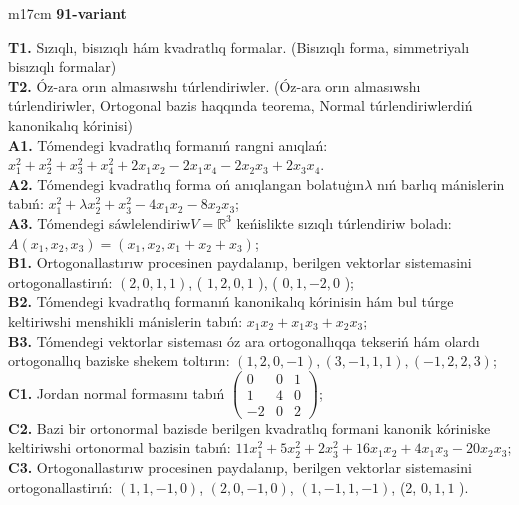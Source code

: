 \documentclass{article}
\begin{document}
\begin{tabular}{m{17cm}}
\textbf{91-variant}
\newline

\textbf{T1.} Sızıqlı, bisızıqlı hám kvadratlıq formalar. (Bisızıqlı forma,  simmetriyalı bisızıqlı formalar)  \\
\textbf{T2.} Óz-ara orın almasıwshı túrlendiriwler. (Óz-ara orın almasıwshı túrlendiriwler,  Ortogonal bazis haqqında teorema,  Normal túrlendiriwlerdiń kanonikalıq kórinisi) \\
\textbf{A1.} Tómendegi kvadratlıq formanıń rangni anıqlań: \(x_{1}^{2} + x_{2}^{2} + x_{3}^{2} + x_{4}^{2} + 2x_{1}x_{2} - 2x_{1}x_{4} - 2x_{2}x_{3} + 2x_{3}x_{4}\). \\
\textbf{A2.} Tómendegi kvadratlıq forma oń anıqlangan bolatuģın\(\lambda\) nıń barlıq mánislerin tabıń: \(x_{1}^{2} + \lambda x_{2}^{2} + x_{3}^{2} - 4x_{1}x_{2} - 8x_{2}x_{3}\); \\
\textbf{A3.} Tómendegi sáwlelendiriw\(V = \mathbb{R}^{3}\) keńislikte sızıqlı túrlendiriw boladı: \(A\left( x_{1},x_{2},x_{3} \right) = \left( x_{1},x_{2},x_{1} + x_{2} + x_{3} \right)\); \\
\textbf{B1.} Ortogonallastırıw procesinen paydalanıp, berilgen vektorlar sistemasini ortogonallastirıń: \((2,0,1,1)\), ( \(1,2,0,1\) ), ( \(0,1, - 2,0\) ); \\
\textbf{B2.} Tómendegi kvadratlıq formanıń kanonikalıq kórinisin hám bul túrge keltiriwshi menshikli mánislerin tabıń: \(x_{1}x_{2} + x_{1}x_{3} + x_{2}x_{3}\); \\
\textbf{B3.} Tómendegi vektorlar sisteması óz ara ortogonallıqqa tekseriń hám olardı ortogonallıq baziske shekem toltırın: \((1,2,0, - 1),(3, - 1,1,1),( - 1,2,2,3)\); \\
\textbf{C1.} Jordan normal formasını tabıń \(\begin{pmatrix} 0 & 0 & 1 \\ 1 & 4 & 0 \\  - 2 & 0 & 2 \end{pmatrix}\); \\
\textbf{C2.} Bazi bir ortonormal bazisde berilgen kvadratlıq formani kanonik kóriniske keltiriwshi ortonormal bazisin tabıń: \(11x_{1}^{2} + 5x_{2}^{2} + 2x_{3}^{2} + 16x_{1}x_{2} + 4x_{1}x_{3} - 20x_{2}x_{3}\); \\
\textbf{C3.} Ortogonallastırıw procesinen paydalanıp, berilgen vektorlar sistemasini ortogonallastirıń: \((1,1, - 1,0)\), \((2,0, - 1,0)\), \((1, - 1,1, - 1)\), (2, \(0,1,1\) ). \\

\end{tabular}
\vspace{1cm}
\end{document}
